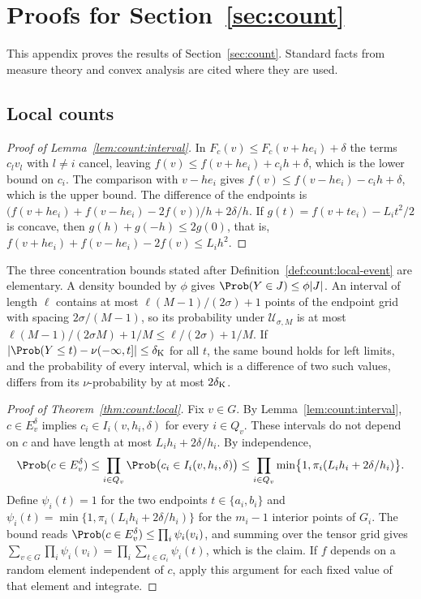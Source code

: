 \section{Proofs for Section~\ref{sec:count}}\label{app:count}

This appendix proves the results of Section~\ref{sec:count}. Standard facts
from measure theory and convex analysis are cited where they are used.

\subsection{Local counts}

\begin{proof}[Proof of Lemma~\ref{lem:count:interval}]
In $F_c(v)\le F_c(v+he_i)+\delta$ the terms $c_lv_l$ with $l\ne i$ cancel,
leaving $f(v)\le f(v+he_i)+c_ih+\delta$, which is the lower bound on $c_i$.
The comparison with $v-he_i$ gives $f(v)\le f(v-he_i)-c_ih+\delta$, which is
the upper bound. The difference of the endpoints is
$\bigl(f(v+he_i)+f(v-he_i)-2f(v)\bigr)/h+2\delta/h$. If
$g(t)=f(v+te_i)-L_it^2/2$ is concave, then $g(h)+g(-h)\le2g(0)$, that is,
$f(v+he_i)+f(v-he_i)-2f(v)\le L_ih^2$.
\end{proof}

The three concentration bounds stated after
Definition~\ref{def:count:local-event} are elementary. A density bounded by
$\phi$ gives $\Prob(Y\in J)\le\phi|J|$. An interval of length $\ell$ contains
at most $\ell(M-1)/(2\sigma)+1$ points of the endpoint grid with spacing
$2\sigma/(M-1)$, so its probability under $\mathcal U_{\sigma,M}$ is at most
$\ell(M-1)/(2\sigma M)+1/M\le\ell/(2\sigma)+1/M$. If
$|\Prob(Y\le t)-\nu(-\infty,t]|\le\delta_{\rm K}$ for all $t$, the same bound
holds for left limits, and the probability of every interval, which is a
difference of two such values, differs from its $\nu$-probability by at most
$2\delta_{\rm K}$.

\begin{proof}[Proof of Theorem~\ref{thm:count:local}]
Fix $v\in G$. By Lemma~\ref{lem:count:interval}, $c\in E_v^\delta$ implies
$c_i\in I_i(v,h_i,\delta)$ for every $i\in Q_v$. These intervals do not
depend on $c$ and have length at most $L_ih_i+2\delta/h_i$. By independence,
\[
 \Prob(c\in E_v^\delta)\le\prod_{i\in Q_v}\Prob\bigl(c_i\in I_i(v,h_i,\delta)\bigr)
 \le\prod_{i\in Q_v}\min\bigl\{1,\pi_i(L_ih_i+2\delta/h_i)\bigr\}.
\]
Define $\psi_i(t)=1$ for the two endpoints $t\in\{a_i,b_i\}$ and
$\psi_i(t)=\min\{1,\pi_i(L_ih_i+2\delta/h_i)\}$ for the $m_i-1$ interior
points of $G_i$. The bound reads $\Prob(c\in E_v^\delta)\le\prod_i\psi_i(v_i)$,
and summing over the tensor grid gives
$\sum_{v\in G}\prod_i\psi_i(v_i)=\prod_i\sum_{t\in G_i}\psi_i(t)$, which is the
claim. If $f$ depends on a random element independent of $c$, apply this
argument for each fixed value of that element and integrate.
\end{proof}

